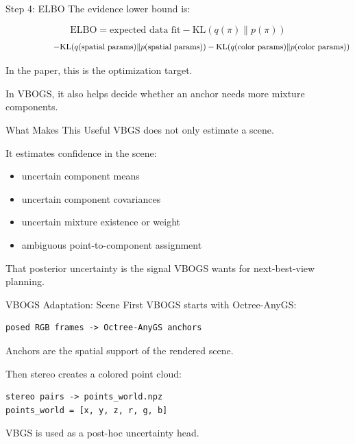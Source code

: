 \documentclass[aspectratio=169]{beamer}
\begin{document}
\begin{frame}{Step 4: ELBO}
  The evidence lower bound is:

  \[
    \mathrm{ELBO}
    =
    \text{expected data fit}
    - \mathrm{KL}(q(\pi)\|p(\pi))
  \]
  \[
    \hspace{5.8em}
    - \mathrm{KL}(q(\text{spatial params})\|p(\text{spatial params}))
    - \mathrm{KL}(q(\text{color params})\|p(\text{color params}))
  \]

  \vspace{0.8em}
  In the paper, this is the optimization target.

  \vspace{0.8em}
  In VBOGS, it also helps decide whether an anchor needs more mixture components.
\end{frame}

\begin{frame}{What Makes This Useful}
  VBGS does not only estimate a scene.

  \vspace{0.8em}
  It estimates confidence in the scene:

  \begin{itemize}
    \item uncertain component means
    \item uncertain component covariances
    \item uncertain mixture existence or weight
    \item ambiguous point-to-component assignment
  \end{itemize}

  \vspace{0.8em}
  That posterior uncertainty is the signal VBOGS wants for next-best-view planning.
\end{frame}

\begin{frame}[fragile]{VBOGS Adaptation: Scene First}
  VBOGS starts with Octree-AnyGS:

\begin{verbatim}
posed RGB frames -> Octree-AnyGS anchors
\end{verbatim}

  Anchors are the spatial support of the rendered scene.

  \vspace{0.8em}
  Then stereo creates a colored point cloud:

\begin{verbatim}
stereo pairs -> points_world.npz
points_world = [x, y, z, r, g, b]
\end{verbatim}

  VBGS is used as a post-hoc uncertainty head.
\end{frame}
\end{document}
